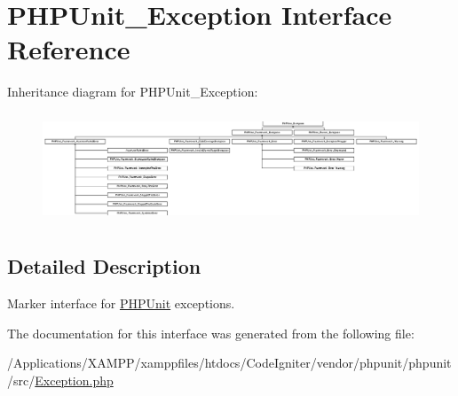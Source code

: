 \hypertarget{interface_p_h_p_unit___exception}{}\section{P\+H\+P\+Unit\+\_\+\+Exception Interface Reference}
\label{interface_p_h_p_unit___exception}
Inheritance diagram for P\+H\+P\+Unit\+\_\+\+Exception\+:\begin{figure}[H]
\begin{center}
\leavevmode
\includegraphics[height=3.290598cm]{interface_p_h_p_unit___exception}
\end{center}
\end{figure}


\subsection{Detailed Description}
Marker interface for \mbox{\hyperlink{namespace_p_h_p_unit}{P\+H\+P\+Unit}} exceptions. 

The documentation for this interface was generated from the following file\+:\begin{DoxyCompactItemize}
\item 
/\+Applications/\+X\+A\+M\+P\+P/xamppfiles/htdocs/\+Code\+Igniter/vendor/phpunit/phpunit/src/\mbox{\hyperlink{phpunit_2phpunit_2src_2_exception_8php}{Exception.\+php}}\end{DoxyCompactItemize}
